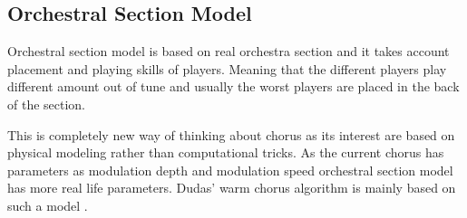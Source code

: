 \subsection{Orchestral Section Model}

Orchestral section model is based on real orchestra section and it takes account
placement and playing skills of players. Meaning that the different players play 
different amount out of tune and usually the worst players are placed in the back of
the section.\cite{dudas}

This is completely new way of thinking about chorus as its interest are based on physical
modeling rather than computational tricks. As the current chorus has parameters as modulation 
depth and modulation speed orchestral section model has more real life parameters. Dudas' warm 
chorus algorithm is mainly based on such a model \cite{dudas}.